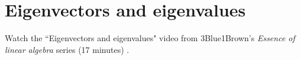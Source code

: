 \section{Eigenvectors and eigenvalues}

Watch the ``Eigenvectors and eigenvalues" video from 3Blue1Brown's
\textit{Essence of linear algebra} series (17 minutes)
\cite{bib:linalg_eigenvectors_and_eigenvalues}.

